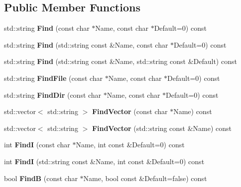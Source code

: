 \subsection*{\-Public \-Member \-Functions}
\begin{DoxyCompactItemize}
\item 
std\-::string {\bfseries \-Find} (const char $\ast$\-Name, const char $\ast$\-Default=0) const \label{classConfiguration_a5a232433925061eee25bfd7da061676a}

\item 
std\-::string {\bfseries \-Find} (std\-::string const \&\-Name, const char $\ast$\-Default=0) const \label{classConfiguration_ab36795f5f418ee9ce536ac7088e4d1e7}

\item 
std\-::string {\bfseries \-Find} (std\-::string const \&\-Name, std\-::string const \&\-Default) const \label{classConfiguration_a47b7799639f8df36713531f842a40103}

\item 
std\-::string {\bfseries \-Find\-File} (const char $\ast$\-Name, const char $\ast$\-Default=0) const \label{classConfiguration_a07142b1420bf7e2ce0a2229f95bb84eb}

\item 
std\-::string {\bfseries \-Find\-Dir} (const char $\ast$\-Name, const char $\ast$\-Default=0) const \label{classConfiguration_ab3d5638ac63eef657a1e85689d52f6a1}

\item 
std\-::vector$<$ std\-::string $>$ {\bfseries \-Find\-Vector} (const char $\ast$\-Name) const \label{classConfiguration_a78f58f96088f0b7cbb3b1b8dd4c00584}

\item 
std\-::vector$<$ std\-::string $>$ {\bfseries \-Find\-Vector} (std\-::string const \&\-Name) const \label{classConfiguration_aa065d8ed54209a194fa6bcb4b511e2b9}

\item 
int {\bfseries \-Find\-I} (const char $\ast$\-Name, int const \&\-Default=0) const \label{classConfiguration_a1759eee00312ae05456741bd4dc22a52}

\item 
int {\bfseries \-Find\-I} (std\-::string const \&\-Name, int const \&\-Default=0) const \label{classConfiguration_a92db0b3f37d548d964dac09ce51aaa15}

\item 
bool {\bfseries \-Find\-B} (const char $\ast$\-Name, bool const \&\-Default=false) const \label{classConfiguration_ac2e09bee1ba20cff2cab8c5aaf80996a}


\end{DoxyCompactItemize}
